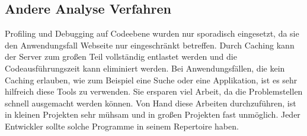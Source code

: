 \subsection{Andere Analyse Verfahren}
Profiling und Debugging auf Codeebene wurden nur sporadisch eingesetzt, da sie den Anwendungsfall Webseite nur eingeschränkt betreffen. Durch Caching kann der Server zum großen Teil vollständig entlastet werden und die Codeausführungszeit kann eliminiert werden. Bei Anwendungsfällen, die kein Caching erlauben, wie zum Beispiel eine Suche oder eine Applikation, ist es sehr hilfreich diese Tools zu verwenden. Sie ersparen viel Arbeit, da die Problemstellen schnell ausgemacht werden können. Von Hand diese Arbeiten durchzuführen, ist in kleinen Projekten sehr mühsam und in großen Projekten fast unmöglich. Jeder Entwickler sollte solche Programme in seinem Repertoire haben.

